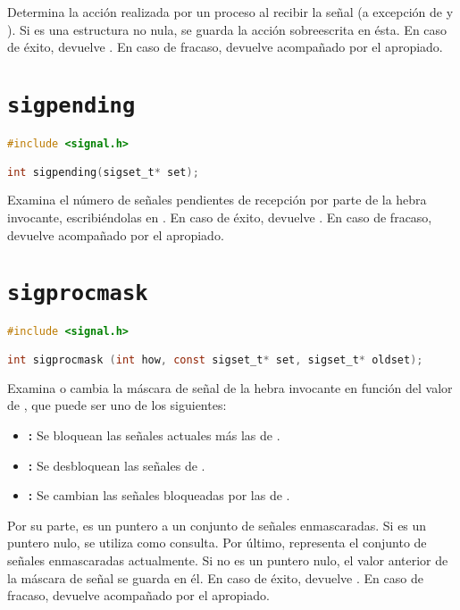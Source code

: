 Determina la acción  realizada por un proceso al recibir la señal  (a excepción de  y ).
Si  es una estructura no nula, se guarda la acción sobreescrita en ésta.
En caso de éxito, devuelve .
En caso de fracaso, devuelve  acompañado por el  apropiado.

\section{\texttt{sigpending}}\label{sigpending}

\begin{lstlisting}[language=C]
#include <signal.h>

int sigpending(sigset_t* set);
\end{lstlisting}

Examina el número de señales pendientes de recepción por parte de la hebra invocante, escribiéndolas en .
En caso de éxito, devuelve .
En caso de fracaso, devuelve  acompañado por el  apropiado.

\section{\texttt{sigprocmask}}\label{sigprocmask}

\begin{lstlisting}[language=C]
#include <signal.h>

int sigprocmask (int how, const sigset_t* set, sigset_t* oldset);
\end{lstlisting}

Examina o cambia la máscara de señal de la hebra invocante en función del valor de , que puede ser uno de los siguientes:

\begin{itemize}
	\item{}\textbf{:} Se bloquean las señales actuales más las de .
	\item{}\textbf{:} Se desbloquean las señales de .
	\item{}\textbf{:} Se cambian las señales bloqueadas por las de .
\end{itemize}

Por su parte,  es un puntero a un conjunto de señales enmascaradas.
Si es un puntero nulo,  se utiliza como consulta.
Por último,  representa el conjunto de señales enmascaradas actualmente.
Si no es un puntero nulo, el valor anterior de la máscara de señal se guarda en él.
En caso de éxito, devuelve .
En caso de fracaso, devuelve  acompañado por el  apropiado.

